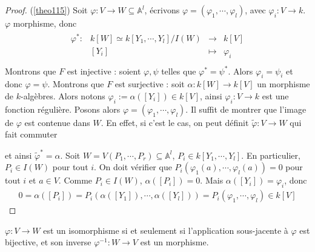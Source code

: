         \begin{proof} (\ref{theo115})
            Soit $\varphi : V \to W \subseteq \mathbb{A}^l$, écrivons $\varphi = (\varphi_1, \cdots, \varphi_l)$, avec $\varphi_i : V \to k$. $\varphi$ morphisme, donc
            \begin{align*}
                \begin{array}{cccc}
                    \varphi^* : & k[W] \simeq k[Y_1, \cdots, Y_l]/I(W) & \to & k[V] \\
                    & [Y_i] & \mapsto & \varphi_i \\
                \end{array}
            \end{align*}
            Montrons que $F$ est injective : soient $\varphi, \psi$ telles que $\varphi^* = \psi^*$. Alors $\varphi_i = \psi_i$ et donc $\varphi = \psi$. Montrons que $F$ est surjective : soit $\alpha : k[W] \to k[V]$ un morphisme de $k$-algèbres. Alors notons $\varphi_i := \alpha([Y_i]) \in k[V]$, ainsi $\varphi_i : V \to k$ est une fonction régulière. Posons alors $\varphi = (\varphi_1, \cdots, \varphi_l)$. Il suffit de montrer que l'image de $\varphi$ est contenue dans $W$. En effet, si c'est le cas, on peut définit $\tilde \varphi : V \to W$ qui fait commuter
            \begin{figure}[H]
                \centering
            \end{figure} \noindent
            et ainsi $\tilde \varphi ^* = \alpha$. Soit $W = V(P_1, \cdots, P_r) \subseteq \mathbb{A}^l$, $P_i \in k[Y_1, \cdots, Y_l]$. En particulier, $P_i \in I(W)$ pour tout $i$. On doit vérifier que $P_i(\varphi_1(a), \cdots, \varphi_l(a)) = 0$ pour tout $i$ et $a \in V$. Comme $P_i \in I(W)$, $\alpha([P_i]) = 0$. Mais $\alpha([Y_i]) = \varphi_i$, donc 
            \begin{align*}
                0 = \alpha([P_i]) = P_i(\alpha([Y_1]), \cdots, \alpha([Y_l])) = P_i(\varphi_1, \cdots, \varphi_l) \in k[V]
            \end{align*}
        \end{proof}
        \begin{prop}
            $\varphi : V \to W$ est un isomorphisme si et seulement si l'application sous-jacente à $\varphi$ est bijective, et son inverse $\varphi^{-1} : W \to V$ est un morphisme.
        \end{prop}
